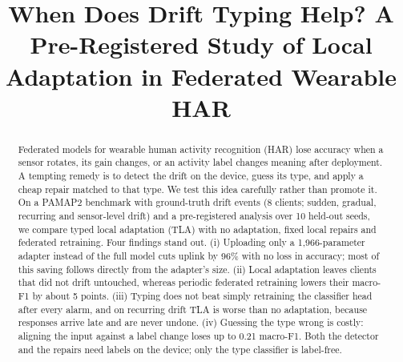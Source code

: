 \documentclass[conference]{IEEEtran}
\newif\ifblind
\newcommand{\fone}{macro-F1}
\newcommand{\tla}{TLA}
\begin{document}
\title{When Does Drift Typing Help? A Pre-Registered Study of Local Adaptation in Federated Wearable HAR}

\ifblind
\author{\IEEEauthorblockN{Anonymous Authors}\IEEEauthorblockA{Paper under double-blind review}}
\else
\author{
\and
{}
}
\fi

\maketitle

\begin{abstract}
Federated models for wearable human activity recognition (HAR) lose accuracy when a sensor rotates, its gain changes, or an activity label changes meaning after deployment. A tempting remedy is to detect the drift on the device, guess its type, and apply a cheap repair matched to that type. We test this idea carefully rather than promote it. On a PAMAP2 benchmark with ground-truth drift events (8 clients; sudden, gradual, recurring and sensor-level drift) and a pre-registered analysis over 10 held-out seeds, we compare typed local adaptation (\tla{}) with no adaptation, fixed local repairs and federated retraining. Four findings stand out. (i) Uploading only a 1{,}966-parameter adapter instead of the full model cuts uplink by 96\% with no loss in accuracy; most of this saving follows directly from the adapter's size. (ii) Local adaptation leaves clients that did not drift untouched, whereas periodic federated retraining lowers their \fone{} by about 5 points. (iii) Typing does not beat simply retraining the classifier head after every alarm, and on recurring drift \tla{} is worse than no adaptation, because responses arrive late and are never undone. (iv) Guessing the type wrong is costly: aligning the input against a label change loses up to 0.21 \fone{}. Both the detector and the repairs need labels on the device; only the type classifier is label-free.
\end{abstract}
\end{document}
